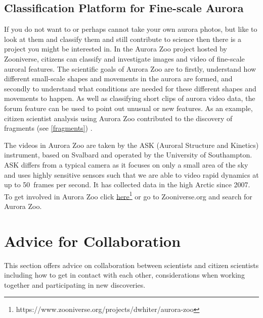 \documentclass{article}
\renewcommand{\cite}[1]{\parencite{#1}}
\newcommand{\contributed}[1]{%
    \par\noindent
    \begingroup
    \setlength{\leftskip}{1em}%
    \itshape
    Contributors: #1
    \par
    \endgroup
    \vspace{0.5em}
}
\begin{document}
\begin{enumerate}
\end{enumerate}



\subsection{Classification Platform for Fine-scale Aurora  }\label{classification}
If you do not want to or perhaps cannot take your own aurora photos, but like to look at them and classify them and still contribute to science then there is a project you might be interested in. In the Aurora Zoo project hosted by Zooniverse, citizens can classify and investigate images and video of fine-scale auroral features. The scientific goals of Aurora Zoo are to firstly, understand how different small-scale shapes and movements in the aurora are formed, and secondly to understand what conditions are needed for these different shapes and movements to happen. As well as classifying short clips of aurora video data, the forum feature can be used to point out unusual or new features. As an example, citizen scientist analysis using Aurora Zoo contributed to the discovery of fragments (see \ref{fragments}) \cite{Whiter2021}.

The videos in Aurora Zoo are taken by the ASK (Auroral Structure and Kinetics) instrument, based on Svalbard and operated by the University of Southampton. ASK differs from a typical camera as it focuses on only a small area of the sky and uses highly sensitive sensors such that we are able to video rapid dynamics at up to 50~frames per second. It has collected data in the high Arctic since 2007.
To get involved in Aurora Zoo click \href{https://www.zooniverse.org/projects/dwhiter/aurora-zoo}{here}\footnote{https://www.zooniverse.org/projects/dwhiter/aurora-zoo} or go to Zooniverse.org and search for Aurora Zoo.


\section{Advice for Collaboration}
This section offers advice on collaboration between scientists and citizen scientists including how to get in contact with each other, considerations when working together and participating in new discoveries. 
\end{document}
